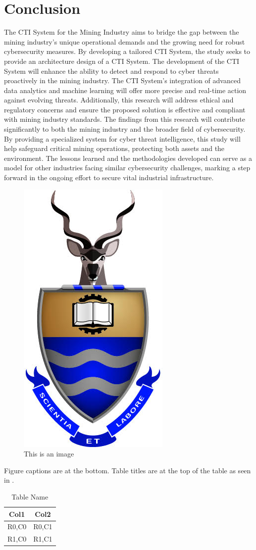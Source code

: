 \documentclass[a4paper,twoside,12pt]{report}
\begin{document}
\chapter{Conclusion}
The CTI System for the Mining Industry aims to bridge the gap between the mining industry's unique operational demands and the growing need for robust cybersecurity measures. By developing a tailored CTI System, the study seeks to provide an architecture design of a CTI System. The development of the CTI System will enhance the ability to detect and respond to cyber threats proactively in the mining industry. The CTI System's integration of advanced data analytics and machine learning will offer more precise and real-time action against evolving threats. Additionally, this research will address ethical and regulatory concerns and ensure the proposed solution is effective and compliant with mining industry standards.
The findings from this research will contribute significantly to both the mining industry and the broader field of cybersecurity. By providing a specialized system for cyber threat intelligence, this study will help safeguard critical mining operations, protecting both assets and the environment. The lessons learned and the methodologies developed can serve as a model for other industries facing similar cybersecurity challenges, marking a step forward in the ongoing effort to secure vital industrial infrastructure.




\begin{figure}[ht]
  \centering
  \includegraphics[width=0.1\linewidth]{images/wits.png}  %
  \caption{This is an image}
  \label{fig:thing1}
\end{figure}

Figure captions are at the bottom. Table titles are at the top of the table as seen in . 

\begin{table}[p]
  \centering
  \caption{Table Name}
  \label{tab:tab1}
  \begin{tabular}{cc}
      \hline
      Col1 & Col2\\
      \hline\hline 
      R0,C0 & R0,C1 \\ 
      R1,C0 & R1,C1 \\ 
      \hline
  \end{tabular} 
\end{table}
\end{document}
